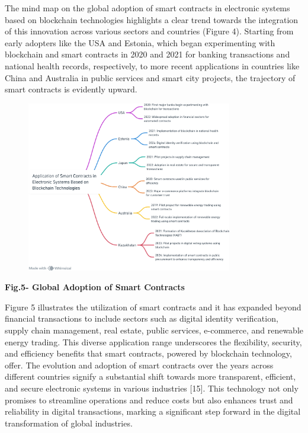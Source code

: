 The mind map on the global adoption of smart contracts in electronic
systems based on blockchain technologies highlights a clear trend
towards the integration of this innovation across various sectors and
countries (Figure 4). Starting from early adopters like the USA and
Estonia, which began experimenting with blockchain and smart contracts
in 2020 and 2021 for banking transactions and national health records,
respectively, to more recent applications in countries like China and
Australia in public services and smart city projects, the trajectory of
smart contracts is evidently upward.

\begin{figure}[H]
	\centering
	\includegraphics[width=0.8\textwidth]{assets/82}
	\caption*{}
\end{figure}

{\bfseries Fig.5- Global Adoption of Smart Contracts}

Figure 5 illustrates the utilization of smart contracts and it has
expanded beyond financial transactions to include sectors such as
digital identity verification, supply chain management, real estate,
public services, e-commerce, and renewable energy trading. This diverse
application range underscores the flexibility, security, and efficiency
benefits that smart contracts, powered by blockchain technology, offer.
The evolution and adoption of smart contracts over the years across
different countries signify a substantial shift towards more
transparent, efficient, and secure electronic systems in various
industries {[}15{]}. This technology not only promises to streamline
operations and reduce costs but also enhances trust and reliability in
digital transactions, marking a significant step forward in the digital
transformation of global industries.

